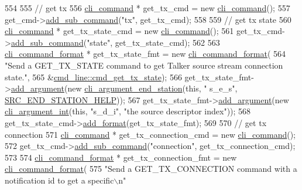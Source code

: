 \begin{DoxyCode}
554 
555     \textcolor{comment}{// get tx}
556     \hyperlink{classcli__command}{cli\_command} * get\_tx\_cmd = \textcolor{keyword}{new} \hyperlink{classcli__command}{cli\_command}();
557     get\_cmd->\hyperlink{classcli__command_aa73a67e8ebb6facd4b40ced66279b226}{add\_sub\_command}(\textcolor{stringliteral}{"tx"}, get\_tx\_cmd);
558 
559     \textcolor{comment}{// get tx state}
560     \hyperlink{classcli__command}{cli\_command} * get\_tx\_state\_cmd = \textcolor{keyword}{new} \hyperlink{classcli__command}{cli\_command}();
561     get\_tx\_cmd->\hyperlink{classcli__command_aa73a67e8ebb6facd4b40ced66279b226}{add\_sub\_command}(\textcolor{stringliteral}{"state"}, get\_tx\_state\_cmd);
562 
563     \hyperlink{classcli__command__format}{cli\_command\_format} * get\_tx\_state\_fmt = \textcolor{keyword}{new} 
      \hyperlink{classcli__command__format}{cli\_command\_format}(
564         \textcolor{stringliteral}{"Send a GET\_TX\_STATE command to get Talker source stream connection state."},
565         &\hyperlink{classcmd__line_a9537b40689b6ca147bd4fb615cb3ee68}{cmd\_line::cmd\_get\_tx\_state});
566     get\_tx\_state\_fmt->\hyperlink{classcli__command__format_ac3fc6d13a227c195d5ee6f7b78eba9cd}{add\_argument}(\textcolor{keyword}{new} \hyperlink{classcli__argument__end__station}{cli\_argument\_end\_station}(\textcolor{keyword}{this}, \textcolor{stringliteral}{"
      s\_e\_s"}, \hyperlink{cmd__line_8cpp_a74df33715dde99b760d515a90f164e1e}{SRC\_END\_STATION\_HELP}));
567     get\_tx\_state\_fmt->\hyperlink{classcli__command__format_ac3fc6d13a227c195d5ee6f7b78eba9cd}{add\_argument}(\textcolor{keyword}{new} \hyperlink{classcli__argument__int}{cli\_argument\_int}(\textcolor{keyword}{this}, \textcolor{stringliteral}{"s\_d\_i"}, \textcolor{stringliteral}{"the
       source descriptor index"}));
568     get\_tx\_state\_cmd->\hyperlink{classcli__command_aa9ec38e761644d946f8db2b920e39921}{add\_format}(get\_tx\_state\_fmt);
569 
570     \textcolor{comment}{// get tx connection}
571     \hyperlink{classcli__command}{cli\_command} * get\_tx\_connection\_cmd = \textcolor{keyword}{new} \hyperlink{classcli__command}{cli\_command}();
572     get\_tx\_cmd->\hyperlink{classcli__command_aa73a67e8ebb6facd4b40ced66279b226}{add\_sub\_command}(\textcolor{stringliteral}{"connection"}, get\_tx\_connection\_cmd);
573 
574     \hyperlink{classcli__command__format}{cli\_command\_format} * get\_tx\_connection\_fmt = \textcolor{keyword}{new} 
      \hyperlink{classcli__command__format}{cli\_command\_format}(
575         \textcolor{stringliteral}{"Send a GET\_TX\_CONNECTION command with a notification id to get a specific\(\backslash\)n"}

\end{DoxyCode}
